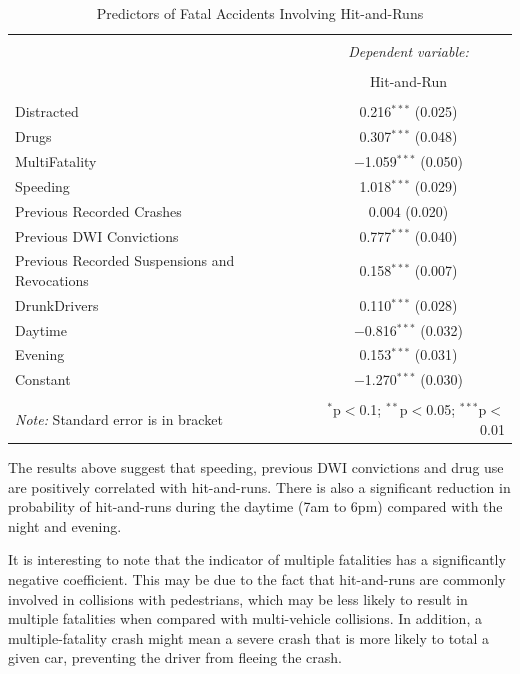 \documentclass[11pt, oneside,titlepage]{article}   	%
\begin{document}
\begin{table}[!htbp] \centering 
	\label{} 
	\begin{tabular}{@{\extracolsep{5pt}}lc} 
		\\[-1.8ex]\hline 
		\hline \\[-1.8ex] 
		& \multicolumn{1}{c}{\textit{Dependent variable:}} \\ 
		\cline{2-2} 
		\\[-1.8ex] & Hit-and-Run \\ 
		\hline \\[-1.8ex] 
		Distracted & 0.216$^{***}$ (0.025) \\ 
		Drugs & 0.307$^{***}$ (0.048) \\ 
		MultiFatality & $-$1.059$^{***}$ (0.050) \\ 
		Speeding & 1.018$^{***}$ (0.029) \\ 
		Previous Recorded Crashes & 0.004 (0.020) \\ 
		Previous DWI Convictions & 0.777$^{***}$ (0.040) \\ 
		Previous Recorded Suspensions and Revocations & 0.158$^{***}$ (0.007) \\ 
		DrunkDrivers & 0.110$^{***}$ (0.028) \\ 
		Daytime & $-$0.816$^{***}$ (0.032) \\ 
		Evening & 0.153$^{***}$ (0.031) \\ 
		Constant & $-$1.270$^{***}$ (0.030) \\  
		\hline \\[-1.8ex] 
		\textit{Note:} Standard error is in bracket & \multicolumn{1}{r}{$^{*}$p$<$0.1; $^{**}$p$<$0.05; $^{***}$p$<$0.01} \\ 
	\end{tabular} 
	\caption{Predictors of Fatal Accidents Involving Hit-and-Runs}
\end{table} 

The results above suggest that speeding, previous DWI convictions and drug use are positively correlated with hit-and-runs. There is also a significant reduction in probability of hit-and-runs during the daytime (7am to 6pm) compared with the night and evening.

It is interesting to note that the indicator of multiple fatalities has a significantly negative coefficient. This may be due to the fact that hit-and-runs are commonly involved in collisions with pedestrians, which may be less likely to result in multiple fatalities when compared with multi-vehicle collisions. In addition, a multiple-fatality crash might mean a severe crash that is more likely to total a given car, preventing the driver from fleeing the crash.
\end{document}
